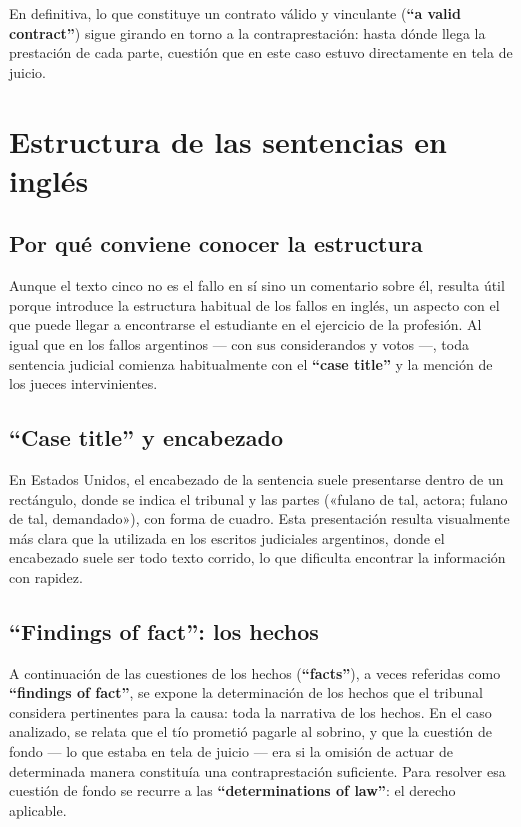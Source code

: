 \documentclass[12pt,oneside]{book}
\begin{document}
En definitiva, lo que constituye un contrato válido y vinculante (\textbf{``a valid contract''}) sigue girando en torno a la contraprestación: hasta dónde llega la prestación de cada parte, cuestión que en este caso estuvo directamente en tela de juicio.

\section{Estructura de las sentencias en inglés}

\subsection{Por qué conviene conocer la estructura}

Aunque el texto cinco no es el fallo en sí sino un comentario sobre él, resulta útil porque introduce la estructura habitual de los fallos en inglés, un aspecto con el que puede llegar a encontrarse el estudiante en el ejercicio de la profesión. Al igual que en los fallos argentinos --- con sus considerandos y votos ---, toda sentencia judicial comienza habitualmente con el \textbf{``case title''} y la mención de los jueces intervinientes.

\subsection{\texorpdfstring{``Case title'' y encabezado}{Case title y encabezado}}

En Estados Unidos, el encabezado de la sentencia suele presentarse dentro de un rectángulo, donde se indica el tribunal y las partes («fulano de tal, actora; fulano de tal, demandado»), con forma de cuadro. Esta presentación resulta visualmente más clara que la utilizada en los escritos judiciales argentinos, donde el encabezado suele ser todo texto corrido, lo que dificulta encontrar la información con rapidez.

\subsection{\texorpdfstring{``Findings of fact'': los hechos}{Findings of fact: los hechos}}

A continuación de las cuestiones de los hechos (\textbf{``facts''}), a veces referidas como \textbf{``findings of fact''}, se expone la determinación de los hechos que el tribunal considera pertinentes para la causa: toda la narrativa de los hechos. En el caso analizado, se relata que el tío prometió pagarle al sobrino, y que la cuestión de fondo --- lo que estaba en tela de juicio --- era si la omisión de actuar de determinada manera constituía una contraprestación suficiente. Para resolver esa cuestión de fondo se recurre a las \textbf{``determinations of law''}: el derecho aplicable.
\end{document}
